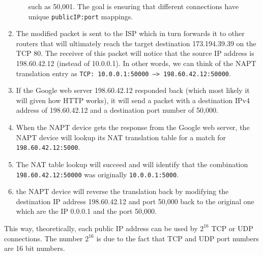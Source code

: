 \documentclass[pdftex,12pt,a4paper]{article}
\begin{document}
\begin{enumerate}
\begin{enumerate}
                                such as 50,001. The goal is ensuring that
                                different connections have unique
                                \texttt{publicIP:port} mappings.
                        \end{enumerate}
                    \item The modified packet is sent to the ISP which in turn
                        forwards it to other routers that will ultimately reach
                        the target destination 173.194.39.39 on the TCP 80. The
                        receiver of this packet will notice that the source IP
                        address is 198.60.42.12 (instead of 10.0.0.1). In other
                        words, we can think of the NAPT translation entry as
                        \texttt{TCP: 10.0.0.1:50000 --> 198.60.42.12:50000}.
                    \item If the Google web server 198.60.42.12 responded back
                        (which most likely it will given how HTTP works), it
                        will send a packet with a destination IPv4 address of
                        198.60.42.12 and a destination port number of 50,000.
                    \item When the NAPT device gets the response from the
                        Google web server, the NAPT device will lookup its NAT
                        translation table for a match for
                        \texttt{198.60.42.12:5000}.
                    \item The NAT table lookup will succeed and will identify
                        that the combination \texttt{198.60.42.12:50000} was
                        originally \texttt{10.0.0.1:5000}.
                    \item the NAPT device will reverse the translation back by
                        modifying the destination IP address 198.60.42.12 and
                        port 50,000 back to the original one which are the IP
                        0.0.0.1 and the port 50,000.
                \end{enumerate}

                This way, theoretically, each public IP address can be used by
                $2^{16}$ TCP or UDP connections. The number $2^{16}$ is due to
                the fact that TCP and UDP port numbers are 16 bit numbers.
\end{document}

